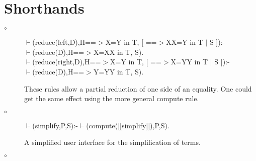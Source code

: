 \documentclass[11pt]{report}
\begin{document}
 \section{Shorthands}
 \begin{description}
 \item[$\circ$]
\begin{sf}\begin{tabbing}
$\vdash$(reduce(left,D),H==$>$X=Y in T, [ ==$>$XX=Y in T $\mid$ S ]):-\\[-0.15ex]
\hspace{2em}$\vdash$(reduce(D),H==$>$X=XX in T, S).\\[-0.15ex]
$\vdash$(reduce(right,D),H==$>$X=Y in T, [ ==$>$X=YY in T $\mid$ S ]):-\\[-0.15ex]
\hspace{2em}$\vdash$(reduce(D),H==$>$Y=YY in T, S).
\end{tabbing}\end{sf}

 These rules allow a partial reduction of one side of
 an equality. One could get the same effect using the
 more general compute rule.
 \item[$\circ$]
\begin{sf}\begin{tabbing}
$\vdash$(simplify,P,S):-$\vdash$(compute([[simplify]]),P,S).
\end{tabbing}\end{sf}

 A simplified user interface for the simplification of terms.
 \item[$\circ$]
 

\end{description}
\end{document}

